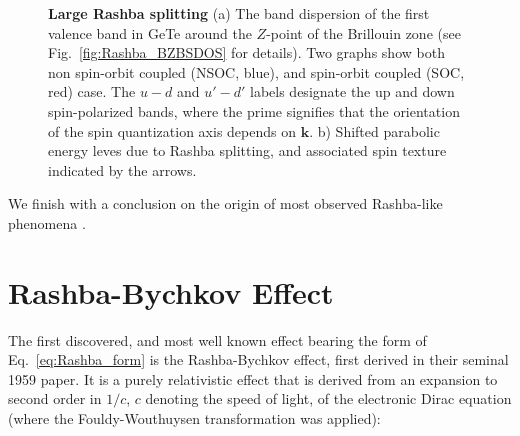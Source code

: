\begin{figure}[h]
	\begin{subfigure}[b]{0.49\textwidth}
	\caption{}
	\end{subfigure}
	\begin{subfigure}[b]{0.49\textwidth}
	\caption{}
	\end{subfigure}
	\caption{\label{fig:Rashba_intro_dispersion}
		{\bf Large Rashba splitting} (a) The band dispersion of the first valence band in GeTe around the $Z$-point of the Brillouin zone (see Fig.~\ref{fig:Rashba_BZBSDOS} for details). Two graphs show both non spin-orbit coupled (NSOC, blue), and spin-orbit coupled (SOC, red) case. The $u-d$ and $u'-d'$ labels designate the up and down spin-polarized bands, where the prime signifies that the orientation of the spin quantization axis depends on $\bm{k}$. b) Shifted parabolic energy leves due to Rashba splitting, and associated spin texture indicated by the arrows.}
\end{figure}

We finish with a conclusion on the origin of most observed Rashba-like phenomena .

\section{Rashba-Bychkov Effect}
The first discovered, and most well known effect bearing the form of Eq.~\ref{eq:Rashba_form} is the Rashba-Bychkov effect, first derived in their seminal 1959 paper\cite{Rashba1959SymmetryAr}.
It is a purely relativistic effect that is derived from an expansion to second order in $1/c$, $c$ denoting the speed of light, of the electronic Dirac equation (where the Fouldy-Wouthuysen transformation was applied):

